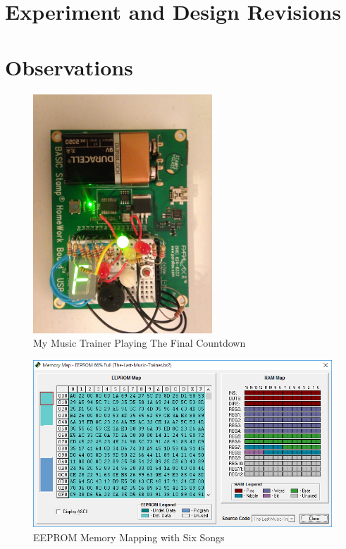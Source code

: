 \documentclass[11pt]{article}
\begin{document}
\section{Experiment and Design Revisions}

\section{Observations}

\begin{figure}[h!]
\centering
\includegraphics[width=0.6\textwidth]{the-music-trainer.jpg}
\caption{My Music Trainer Playing The Final Countdown}
\label{the-music-trainer}
\end{figure}

\begin{figure}[h!]
\centering
\includegraphics[width=\textwidth]{memory-map.png}
\caption{EEPROM Memory Mapping with Six Songs}
\label{memory-map}
\end{figure}
\end{document}
